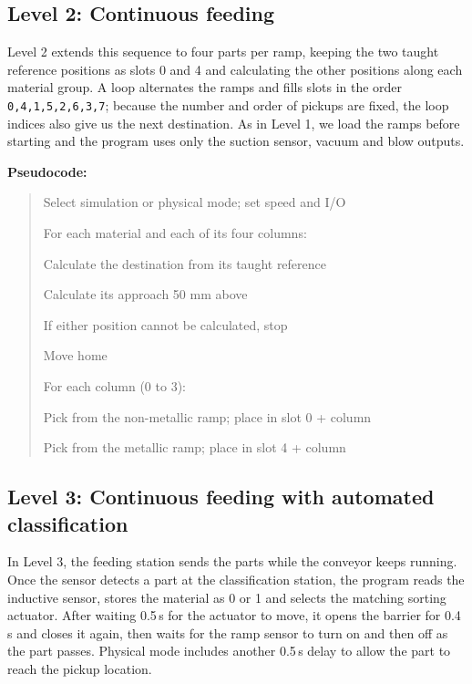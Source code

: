 \documentclass[11pt,a4paper]{article}
\begin{document}
\subsection{Level 2: Continuous feeding}
Level 2 extends this sequence to four parts per ramp, keeping the two taught reference positions as slots 0 and 4 and calculating the other positions along each material group. A loop alternates the ramps and fills slots in the order \texttt{0,4,1,5,2,6,3,7}; because the number and order of pickups are fixed, the loop indices also give us the next destination. As in Level 1, we load the ramps before starting and the program uses only the suction sensor, vacuum and blow outputs.

\noindent\begin{minipage}{\linewidth}
\textbf{Pseudocode:}
\begin{quote}\small\ttfamily\setlength{\parskip}{0pt}
Select simulation or physical mode; set speed and I/O\par
For each material and each of its four columns:\par
\hspace*{1em}Calculate the destination from its taught reference\par
\hspace*{1em}Calculate its approach 50 mm above\par
\hspace*{1em}If either position cannot be calculated, stop\par
Move home\par
For each column (0 to 3):\par
\hspace*{1em}Pick from the non-metallic ramp; place in slot 0 + column\par
\hspace*{1em}Pick from the metallic ramp; place in slot 4 + column
\end{quote}
\end{minipage}

\subsection{Level 3: Continuous feeding with automated classification}
In Level 3, the feeding station sends the parts while the conveyor keeps running. Once the sensor detects a part at the classification station, the program reads the inductive sensor, stores the material as 0 or 1 and selects the matching sorting actuator. After waiting 0.5\,s for the actuator to move, it opens the barrier for 0.4\,s and closes it again, then waits for the ramp sensor to turn on and then off as the part passes. Physical mode includes another 0.5\,s delay to allow the part to reach the pickup location.
\end{document}
